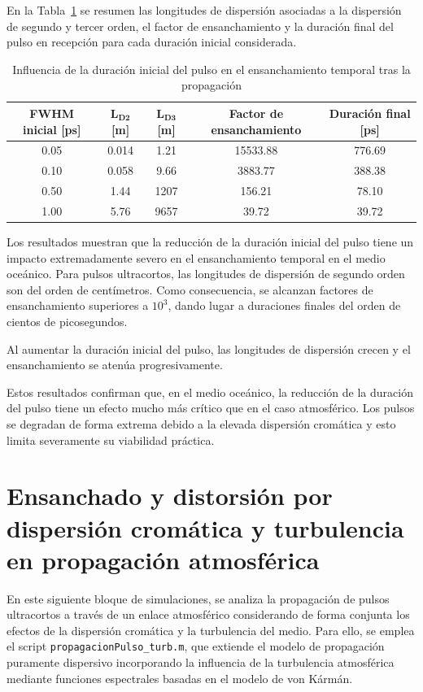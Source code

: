 En la Tabla~\ref{tabla_oceano_duracion_pulso} se resumen las longitudes de dispersión asociadas a la dispersión de segundo y tercer orden, el factor de ensanchamiento y la duración final del pulso en recepción para cada duración inicial considerada.


\begin{table}[H]
\centering
\hspace*{-1.2cm}
\renewcommand{\arraystretch}{1.2}
\begin{tabular}{|c|c|c|c|c|}
\hline
\textbf{FWHM inicial [ps]} & $\mathbf{L_{D2}}$ \textbf{[m]} & $\mathbf{L_{D3}}$ \textbf{[m]} & \textbf{Factor de ensanchamiento} & \textbf{Duración final [ps]} \\
\hline
0.05 & 0.014 & 1.21  & 15533.88 & 776.69 \\
0.10 & 0.058 & 9.66  & 3883.77  & 388.38 \\
0.50 & 1.44  & 1207  & 156.21   & 78.10  \\
1.00 & 5.76  & 9657  & 39.72    & 39.72  \\
\hline
\end{tabular}
\caption{Influencia de la duración inicial del pulso en el ensanchamiento temporal tras la propagación}
\label{tabla_oceano_duracion_pulso}
\end{table}


Los resultados muestran que la reducción de la duración inicial del pulso tiene un impacto extremadamente severo en el ensanchamiento temporal en el medio oceánico. Para pulsos ultracortos, las longitudes de dispersión de segundo orden son del orden de centímetros. Como consecuencia, se alcanzan factores de ensanchamiento superiores a $10^3$, dando lugar a duraciones finales del orden de cientos de picosegundos.

Al aumentar la duración inicial del pulso, las longitudes de dispersión crecen y el ensanchamiento se atenúa progresivamente.

Estos resultados confirman que, en el medio oceánico, la reducción de la duración del pulso tiene un efecto mucho más crítico que en el caso atmosférico. Los pulsos se degradan de forma extrema debido a la elevada dispersión cromática y esto limita severamente su viabilidad práctica.

\section{Ensanchado y distorsión por dispersión cromática y turbulencia en propagación atmosférica}
En este siguiente bloque de simulaciones, se analiza la propagación de pulsos ultracortos a través de un enlace atmosférico considerando de forma conjunta los efectos de la dispersión cromática y la turbulencia del medio. Para ello, se emplea el script \texttt{propagacionPulso\_turb.m}, que extiende el modelo de propagación puramente dispersivo incorporando la influencia de la turbulencia atmosférica mediante funciones espectrales basadas en el modelo de von Kármán.


